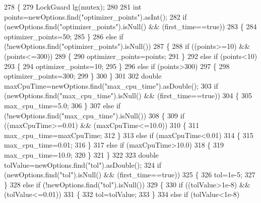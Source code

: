 \begin{DoxyCode}
278 \{
279     LockGuard lg(mutex);
280 
281     \textcolor{keywordtype}{int} points=newOptions.find(\textcolor{stringliteral}{"optimizer\_points"}).asInt();
282     \textcolor{keywordflow}{if} (newOptions.find(\textcolor{stringliteral}{"optimizer\_points"}).isNull() && (first\_time==\textcolor{keyword}{true}))
283     \{
284         optimizer_points=50;
285     \}
286     \textcolor{keywordflow}{else} \textcolor{keywordflow}{if} (!newOptions.find(\textcolor{stringliteral}{"optimizer\_points"}).isNull())
287     \{
288         \textcolor{keywordflow}{if} ((points>=10) && (points<=300))
289         \{
290             optimizer_points=points;
291         \}
292         \textcolor{keywordflow}{else} \textcolor{keywordflow}{if} (points<10)
293         \{
294             optimizer_points=10;
295         \}
296         \textcolor{keywordflow}{else} \textcolor{keywordflow}{if} (points>300)
297         \{
298             optimizer_points=300;
299         \}
300     \}
301 
302     \textcolor{keywordtype}{double} maxCpuTime=newOptions.find(\textcolor{stringliteral}{"max\_cpu\_time"}).asDouble();
303     \textcolor{keywordflow}{if} (newOptions.find(\textcolor{stringliteral}{"max\_cpu\_time"}).isNull() && (first\_time==\textcolor{keyword}{true}))
304     \{
305         max_cpu_time=5.0;
306     \}
307     \textcolor{keywordflow}{else} \textcolor{keywordflow}{if} (!newOptions.find(\textcolor{stringliteral}{"max\_cpu\_time"}).isNull())
308     \{
309         \textcolor{keywordflow}{if} ((maxCpuTime>=0.01) && (maxCpuTime<=10.0))
310         \{
311             max_cpu_time=maxCpuTime;
312         \}
313         \textcolor{keywordflow}{else} \textcolor{keywordflow}{if} (maxCpuTime<0.01)
314         \{
315             max_cpu_time=0.01;
316         \}
317         \textcolor{keywordflow}{else} \textcolor{keywordflow}{if} (maxCpuTime>10.0)
318         \{
319             max_cpu_time=10.0;
320         \}
321     \}
322 
323     \textcolor{keywordtype}{double} tolValue=newOptions.find(\textcolor{stringliteral}{"tol"}).asDouble();
324     \textcolor{keywordflow}{if} (newOptions.find(\textcolor{stringliteral}{"tol"}).isNull() && (first\_time==\textcolor{keyword}{true}))
325     \{
326         tol=1e-5;
327     \}
328     \textcolor{keywordflow}{else} \textcolor{keywordflow}{if} (!newOptions.find(\textcolor{stringliteral}{"tol"}).isNull())
329     \{
330         \textcolor{keywordflow}{if} ((tolValue>1e-8) && (tolValue<=0.01))
331         \{
332             tol=tolValue;
333         \}
334         \textcolor{keywordflow}{else} \textcolor{keywordflow}{if} (tolValue<1e-8)

\end{DoxyCode}
